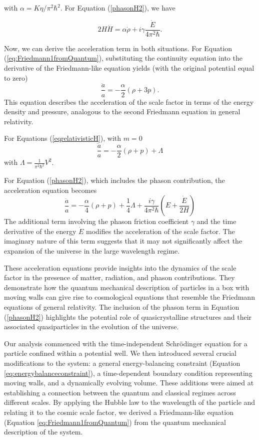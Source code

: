 \documentclass{article}
\begin{document}
with $\alpha = K\eta/\pi^2 \hbar^2$. For Equation (\ref{phasonH2}), we have

\begin{equation}
2H \dot{H} = \alpha \dot{\rho} + i\gamma\frac{\dot{E}}{4\pi^{2}\hbar}.
\end{equation}

Now, we can derive the acceleration term in both situations. For Equation (\ref{eq:Friedmann1fromQuantum}), substituting the continuity equation into the derivative of the Friedmann-like equation yields (with the original potential equal to zero)
\begin{equation}
\frac{\ddot{a}}{a} = -\frac{\alpha}{2} (\rho + 3p).
\end{equation}
This equation describes the acceleration of the scale factor in terms of the energy density and pressure, analogous to the second Friedmann equation in general relativity.

For Equations (\ref{eqrelativisticH}), with $m=0$
\begin{equation}
\frac{\ddot{a}}{a}=-\frac{\alpha}{2}(\rho+p)+\Lambda \label{freedmanrela1}
\end{equation}
with $\Lambda=\frac{1}{\pi^{2}\hbar^{2}}V^{2}$.

For Equation (\ref{phasonH2}), which includes the phason contribution, the acceleration equation becomes
\begin{equation}
\frac{\ddot{a}}{a}=-\frac{\alpha}{4}(\rho+p)+\frac{1}{4}\Lambda+\frac{i\gamma}{4\pi^{2}\hbar}(E+\frac{\dot{E}}{2H}) \label{freedmanrela2}
\end{equation}
The additional term involving the phason friction coefficient $\gamma$ and the time derivative of the energy $\dot{E}$ modifies the acceleration of the scale factor. The imaginary nature of this term suggests that it may not significantly affect the expansion of the universe in the large wavelength regime.

These acceleration equations provide insights into the dynamics of the scale factor in the presence of matter, radiation, and phason contributions. They demonstrate how the quantum mechanical description of particles in a box with moving walls can give rise to cosmological equations that resemble the Friedmann equations of general relativity. The inclusion of the phason term in Equation (\ref{phasonH2}) highlights the potential role of quasicrystalline structures and their associated quasiparticles in the evolution of the universe.


Our analysis commenced with the time-independent Schr{\"o}dinger equation for a particle confined within a potential well. We then introduced several crucial modifications to the system: a general energy-balancing constraint (Equation \ref{eq:energybalanceconstraint}), a time-dependent boundary condition representing moving walls, and a dynamically evolving volume. These additions were aimed at establishing a connection between the quantum and classical regimes across different scales. By applying the Hubble law to the wavelength of the particle and relating it to the cosmic scale factor, we derived a Friedmann-like equation (Equation \ref{eq:Friedmann1fromQuantum}) from the quantum mechanical description of the system.
\end{document}
